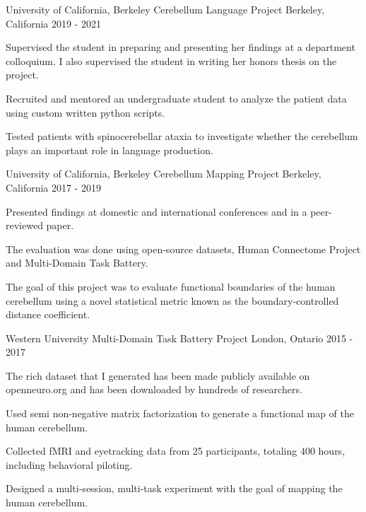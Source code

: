 \begin{cventries}
  \cventry
    {University of California, Berkeley} %
    {Cerebellum Language Project} %
    {Berkeley, California} %
    {2019 - 2021} %
    {
      \begin{cvitems} %
        \item {Supervised the student in preparing and presenting her findings at a department colloquium. I also supervised the student in writing her honors thesis on the project.}
        \item {Recruited and mentored an undergraduate student to analyze the patient data using custom written python scripts.}
        \item {Tested patients with spinocerebellar ataxia to investigate whether the cerebellum plays an important role in language production.}
      \end{cvitems}
    }
    
  \cventry
  	{University of California, Berkeley} %
    {Cerebellum Mapping Project} %
    {Berkeley, California} %
    {2017 - 2019} %
    {
      \begin{cvitems} %
      	\item {Presented findings at domestic and international conferences and in a peer-reviewed paper.}
        \item {The evaluation was done using open-source datasets, Human Connectome Project and Multi-Domain Task Battery.}
        \item {The goal of this project was to evaluate functional boundaries of the human cerebellum using a novel statistical metric known as the boundary-controlled distance coefficient.}
      \end{cvitems}
    }
    
  \cventry
  	{Western University} %
    {Multi-Domain Task Battery Project} %
    {London, Ontario} %
    {2015 - 2017} %
    {
      \begin{cvitems} %
        \item {The rich dataset that I generated has been made publicly available on openneuro.org and has been downloaded by hundreds of researchers.}
        \item {Used semi non-negative matrix factorization to generate a functional map of the human cerebellum.}
        \item {Collected fMRI and eyetracking data from 25 participants, totaling 400 hours, including behavioral piloting.}
        \item {Designed a multi-session, multi-task experiment with the goal of mapping the human cerebellum.}
      \end{cvitems}
    }

\end{cventries}
